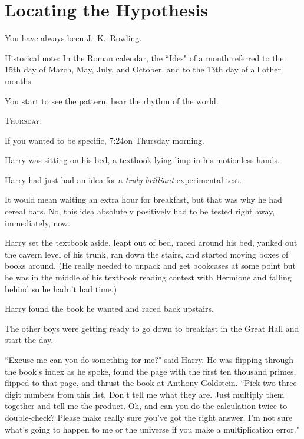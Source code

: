 \chapter{Locating the Hypothesis}

\begin{chapterOpeningAuthorNote}
You have always been J.~K.~Rowling.

Historical note: In the Roman calendar, the ``Ides" of a month referred to the 15th day of March, May, July, and October, and to the 13th day of all other months.
\end{chapterOpeningAuthorNote}
\begin{chapterOpeningQuote}
You start to see the pattern, hear the rhythm of the world.
\end{chapterOpeningQuote}

\lettrine{T}{hursday}.

\hplettrineextrapara
If you wanted to be specific, 7:24\am on Thursday morning.

Harry was sitting on his bed, a textbook lying limp in his motionless hands.

Harry had just had an idea for a \emph{truly brilliant} experimental test.

It would mean waiting an extra hour for breakfast, but that was why he had cereal bars. No, this idea absolutely positively had to be tested right away, immediately, now.

Harry set the textbook aside, leapt out of bed, raced around his bed, yanked out the cavern level of his trunk, ran down the stairs, and started moving boxes of books around. (He really needed to unpack and get bookcases at some point but he was in the middle of his textbook reading contest with Hermione and falling behind so he hadn't had time.)

Harry found the book he wanted and raced back upstairs.

The other boys were getting ready to go down to breakfast in the Great Hall and start the day.

``Excuse me can you do something for me?" said Harry. He was flipping through the book's index as he spoke, found the page with the first ten thousand primes, flipped to that page, and thrust the book at Anthony Goldstein. ``Pick two three-digit numbers from this list. Don't tell me what they are. Just multiply them together and tell me the product. Oh, and can you do the calculation twice to double-check? Please make really sure you've got the right answer, I'm not sure what's going to happen to me or the universe if you make a multiplication error."

